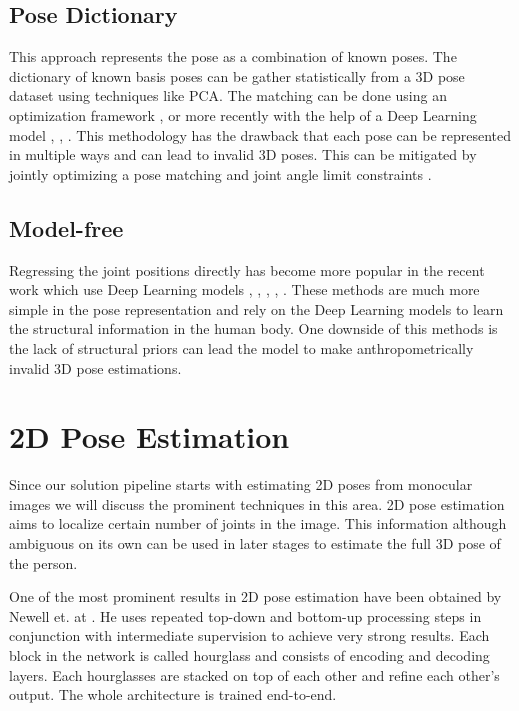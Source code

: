 \subsection{Pose Dictionary}

This approach represents the pose as a combination of known poses. The dictionary of known basis poses can be gather statistically from a 3D pose dataset using techniques like PCA. The matching can be done using an optimization framework  \parencite{ramakrishna2012reconstructing}, \parencite{zhou20153d} or more recently with the help of a Deep Learning model \parencite{zhou2016sparseness}, \parencite{chen20173d}, \parencite{tome2017lifting}. This methodology has the drawback that each pose can be represented in multiple ways and can lead to invalid 3D poses. This can be mitigated by jointly optimizing a pose matching and joint angle limit constraints \parencite{akhter2015pose}.

\subsection{Model-free}

Regressing the joint positions directly has become more popular in the recent work which use Deep Learning models , \parencite{pavlakos2017coarse}, \parencite{martinez2017simple}, \parencite{hossain2017exploiting}, \parencite{tekin2017learning}. These methods are much more simple in the pose representation and rely on the Deep Learning models to learn the structural information in the human body. One downside of this methods is the lack of structural priors can lead the model to make anthropometrically invalid 3D pose estimations.

\section{2D Pose Estimation}

Since our solution pipeline starts with estimating 2D poses from monocular images we will discuss the prominent techniques in this area. 2D pose estimation aims to localize certain number of joints in the image. This information although ambiguous on its own can be used in later stages to estimate the full 3D pose of the person.

One of the most prominent results in 2D pose estimation have been obtained by Newell et. at \parencite{newell2016stacked}. He uses repeated top-down and bottom-up processing steps in conjunction with intermediate supervision to achieve very strong results. Each block in the network is called hourglass and consists of encoding and decoding layers. Each hourglasses are stacked on top of each other and refine each other's output. The whole architecture is trained end-to-end.

